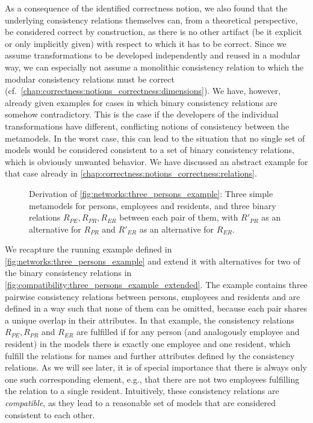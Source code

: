 As a consequence of the identified correctness notion, we also found that the underlying consistency relations themselves can, from a theoretical perspective, be considered correct by construction, as there is no other artifact (be it explicit or only implicitly given) with respect to which it has to be correct.
Since we assume transformations to be developed independently and reused in a modular way, we can especially not assume a monolithic consistency relation to which the modular consistency relations must be correct (cf.\ \autoref{chap:correctness:notions_correctness:dimensions}).
We have, however, already given examples for cases in which binary consistency relations are somehow contradictory.
This is the case if the developers of the individual transformations have different, conflicting notions of consistency between the metamodels.
In the worst case, this can lead to the situation that no single set of models would be considered consistent to a set of binary consistency relations, which is obviously unwanted behavior.
We have discussed an abstract example for that case already in \autoref{chap:correctness:notions_correctness:relations}.

\begin{figure}
    \centering
    
    \caption[Three metamodels with (in)compatible consistency relations]{Derivation of \autoref{fig:networks:three_persons_example}: Three simple metamodels for persons, employees and residents, and three binary relations $R_{PE}, R_{PR}, R_{ER}$ between each pair of them, with $R'_{PR}$ as an alternative for $R_{PR}$ and $R'_{ER}$ as an alternative for $R_{ER}$.}
    \label{fig:compatibility:three_persons_example_extended}
\end{figure}

We recapture the running example defined in \autoref{fig:networks:three_persons_example} and extend it with alternatives for two of the binary consistency relations in \autoref{fig:compatibility:three_persons_example_extended}.
The example contains three pairwise consistency relations between persons, employees and residents and are defined in a way such that none of them can be omitted, because each pair shares a unique overlap in their attributes.
In that example, the consistency relations $R_{PE}, R_{PR}$ and $R_{ER}$ are fulfilled if for any person (and analogously employee and resident) in the models there is exactly one employee and one resident, which fulfill the relations for names and further attributes defined by the consistency relations.
As we will see later, it is of special importance that there is always only one such corresponding element, e.g., that there are not two employees fulfilling the relation to a single resident.
Intuitively, these consistency relations are \emph{compatible}, as they lead to a reasonable set of models that are considered consistent to each other.


